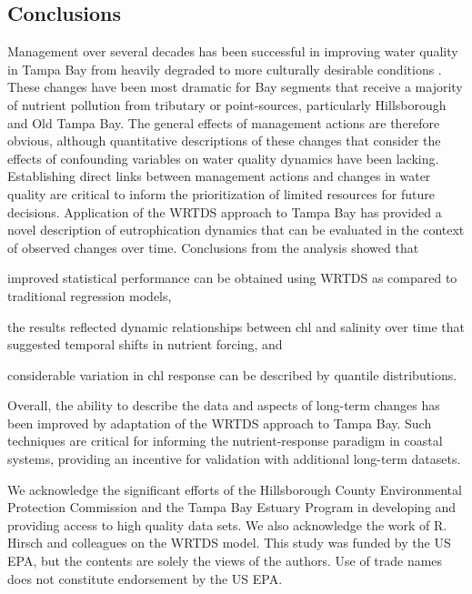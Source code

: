 \documentclass{svjour3}\usepackage[]{graphicx}\usepackage[]{color}
\begin{document}
\subsection{Conclusions}

Management over several decades has been successful in improving water quality in Tampa Bay from heavily degraded to more culturally desirable conditions \cite{Greening06}.  These changes have been most dramatic for Bay segments that receive a majority of nutrient pollution from tributary or point-sources, particularly Hillsborough and Old Tampa Bay.  The general effects of management actions are therefore obvious, although quantitative descriptions of these changes that consider the effects of confounding variables on water quality dynamics have been lacking.  Establishing direct links between management actions and changes in water quality are critical to inform the prioritization of limited resources for future decisions.  Application of the \ac{WRTDS} approach to Tampa Bay has provided a novel description of eutrophication dynamics that can be evaluated in the context of observed changes over time.  Conclusions from the analysis showed that\begin{inparaenum}[1\upshape)]
\item improved statistical performance can be obtained using \ac{WRTDS} as compared to traditional regression models,
\item the results reflected dynamic relationships between \ac{chl} and salinity over time that suggested temporal shifts in nutrient forcing, and 
\item considerable variation in \ac{chl} response can be described by quantile distributions.
\end{inparaenum}
Overall, the ability to describe the data and aspects of long-term changes has been improved by adaptation of the \ac{WRTDS} approach to Tampa Bay. Such techniques are critical for informing the nutrient-response paradigm in coastal systems, providing an incentive for validation with additional long-term datasets.

\begin{acknowledgements}
We acknowledge the significant efforts of the Hillsborough County Environmental Protection Commission and the Tampa Bay Estuary Program in developing and providing access to high quality data sets.  We also acknowledge the work of R. Hirsch and colleagues on the \ac{WRTDS} model. This study was funded by the US \ac{EPA}, but the contents are solely the views of the authors.  Use of trade names does not constitute endorsement by the US \ac{EPA}.
\end{acknowledgements}
\end{document}
